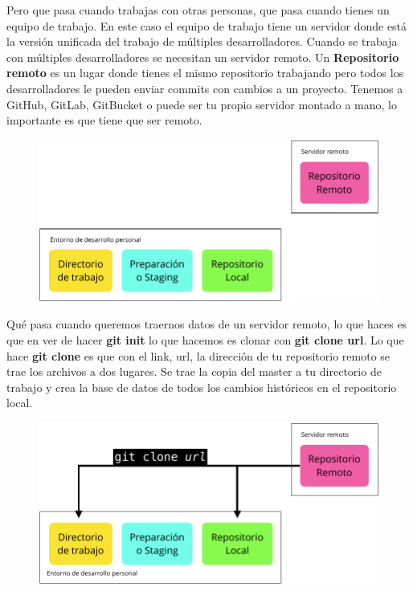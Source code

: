 \documentclass{article}
\begin{document}
Pero que pasa cuando trabajas con otras personas, que pasa cuando tienes un
equipo de trabajo. En este caso el equipo de trabajo tiene un servidor donde
está la versión unificada del trabajo de múltiples desarrolladores. Cuando se
trabaja con múltiples desarrolladores se necesitan un servidor remoto. Un
\textbf{Repositorio remoto} es un lugar donde tienes el mismo repositorio
trabajando pero todos los desarrolladores le pueden enviar commits con cambios
a un proyecto. Tenemos a GitHub, GitLab, GitBucket o puede ser tu propio
servidor montado a mano, lo importante es que tiene que ser remoto.

\begin{figure}[h!]
  \centering
  \includegraphics[scale=0.6]{./Pictures/122_repo_remoto.png}
\end{figure}

Qué pasa cuando queremos traernos datos de un servidor remoto, lo que haces es
que en ver de hacer \textbf{git init} lo que hacemos es clonar con \textbf{git
clone url}. Lo que hace \textbf{git clone} es que con el link, url, la
dirección de tu repositorio remoto se trae los archivos a dos lugares. Se trae
la copia del master a tu directorio de trabajo y crea la base de datos de todos
los cambios históricos en el repositorio local.

\newpage

\begin{figure}[h!]
  \centering
  \includegraphics[scale=0.6]{./Pictures/123_git_clone.png}
\end{figure}
\end{document}
